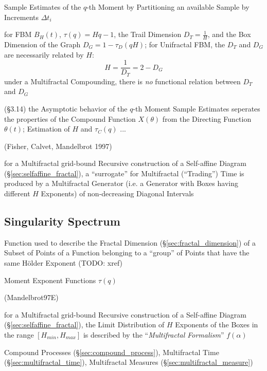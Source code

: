 Sample Estimates of the $q$-th Moment by Partitioning an available Sample by
Increments $\Delta t_i$

for FBM $B_H(t)$, $\tau(q) = Hq - 1$, the Trail Dimension $D_T = \frac{1}{H}$,
and the Box Dimension of the Graph $D_G = 1 - \tau_D(qH)$; for Unifractal FBM,
the $D_T$ and $D_G$ are necessarily related by $H$:
\[
  H = \frac{1}{D_T} = 2 - D_G
\]
under a Multifractal Compounding, there is \emph{no} functional relation between
$D_T$ and $D_G$

(\S 3.14) the Asymptotic behavior of the $q$-th Moment Sample Estimates
seperates the properties of the Compound Function $X(\theta)$ from the Directing
Function $\theta(t)$; Estimation of $H$ and $\tau_C(q)$ ...

(Fisher, Calvet, Mandelbrot 1997)

for a Multifractal grid-bound Recursive construction of a Self-affine Diagram
(\S\ref{sec:selfaffine_fractal}), a ``surrogate'' for Multifractal (``Trading'')
Time is produced by a Multifractal Generator (i.e. a Generator with Boxes having
different $H$ Exponents) of non-decreasing Diagonal Intervals



\subsection{Singularity Spectrum}\label{sec:singularity_spectrum}

Function used to describe the Fractal Dimension (\S\ref{sec:fractal_dimension})
of a Subset of Points of a Function belonging to a ``group'' of Points that have
the same H\"older Exponent (TODO: xref)

Moment Exponent Functions $\tau(q)$

(Mandelbrot97E)

for a Multifractal grid-bound Recursive construction of a Self-affine Diagram
(\S\ref{sec:selfaffine_fractal}), the Limit Distribution of $H$ Exponents of the
Boxes in the range $[H_{min}, H_{max}]$ is described by the
``\emph{Multifractal Formalism}'' $f(\alpha)$

\fist Compound Processes (\S\ref{sec:compound_process}), Multifractal Time
(\S\ref{sec:multifractal_time}), Multifractal Measures
(\S\ref{sec:multifractal_measure})
